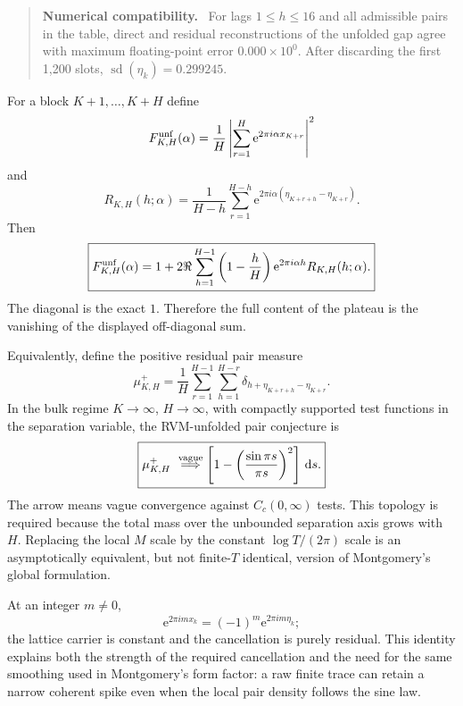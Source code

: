\documentclass[11pt]{amsart}
\theoremstyle{definition}
\theoremstyle{remark}
\newcommand{\dd}{\,\mathrm d}
\newcommand{\ee}{\mathrm e}
\newenvironment{numericalcheck}
{\begin{quote}\small\noindent\textbf{Numerical compatibility.}\ }{\end{quote}}
\begin{document}
\begin{numericalcheck}
For lags $1\le h\le16$ and all admissible pairs in the table, direct and
residual reconstructions of the unfolded gap agree with maximum floating-point
error $0.000\times10^0$.  After discarding the first 1,200 slots,
$\operatorname{sd}(\eta_k)=0.299245$.
\end{numericalcheck}

For a block $K+1,\ldots,K+H$ define
\begin{equation}\label{eq:unfolded_form_factor}
F_{K,H}^{\rm unf}(\alpha)
=\frac1H\left|\sum_{r=1}^{H}\ee^{2\pi i\alpha x_{K+r}}\right|^2
\end{equation}
and
\begin{equation}\label{eq:Rcov}
R_{K,H}(h;\alpha)
=\frac1{H-h}\sum_{r=1}^{H-h}
\ee^{2\pi i\alpha(\eta_{K+r+h}-\eta_{K+r})}.
\end{equation}
Then
\begin{equation}\label{eq:residual_form_factor}
\boxed{
F_{K,H}^{\rm unf}(\alpha)
=1+2\Re\sum_{h=1}^{H-1}
\left(1-\frac hH\right)\ee^{2\pi i\alpha h}R_{K,H}(h;\alpha).}
\end{equation}
The diagonal is the exact $1$.  Therefore the full content of the plateau is
the vanishing of the displayed off-diagonal sum.

Equivalently, define the positive residual pair measure
\begin{equation}\label{eq:residual_measure}
\mu_{K,H}^{+}
=\frac1H\sum_{r=1}^{H-1}\sum_{h=1}^{H-r}
\delta_{h+\eta_{K+r+h}-\eta_{K+r}}.
\end{equation}
In the bulk regime $K\to\infty$, $H\to\infty$, with compactly supported test
functions in the separation variable, the RVM-unfolded pair conjecture is
\begin{equation}\label{eq:residual_sine}
\boxed{
\mu_{K,H}^{+}\ \stackrel{\rm vague}{\Longrightarrow}
\left[1-\left(\frac{\sin\pi s}{\pi s}\right)^2\right]\dd s.}
\end{equation}
The arrow means vague convergence against $C_c(0,\infty)$ tests.  This
topology is required because the total mass over the unbounded separation
axis grows with $H$.  Replacing the local $M$ scale by the constant
$\log T/(2\pi)$ scale is an asymptotically equivalent, but not finite-$T$
identical, version of Montgomery's global formulation.

At an integer $m\ne0$,
\begin{equation}\label{eq:integer_mode}
\ee^{2\pi imx_k}=(-1)^m\ee^{2\pi im\eta_k};
\end{equation}
the lattice carrier is constant and the cancellation is purely residual.  This
identity explains both the strength of the required cancellation and the need
for the same smoothing used in Montgomery's form factor: a raw finite trace
can retain a narrow coherent spike even when the local pair density follows
the sine law.
\end{document}
